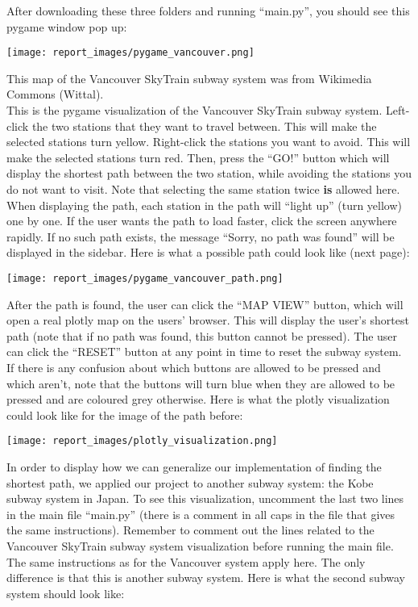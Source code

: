 \documentclass[fontsize=11pt]{article}
\begin{document}
After downloading these three folders and running ``main.py”, you should see this pygame window pop up:

\bigskip
 
\centerline{
    \texttt{[image: report\_images/pygame\_vancouver.png]}
}

\bigskip

This map of the Vancouver SkyTrain subway system was from Wikimedia Commons (Wittal). \\
 
This is the pygame visualization of the Vancouver SkyTrain subway system. Left-click the two stations that they want to travel between. This will make the  selected stations turn yellow. Right-click the stations you want to avoid. This will make the selected stations turn red. Then, press the ``GO!” button which will display the shortest path between the two station, while avoiding the stations you do not want to visit. Note that selecting the same station twice \textbf{is} allowed here. When displaying the path, each station in the path will ``light up” (turn yellow) one by one. If the user wants the path to load faster, click the screen anywhere rapidly. If no such path exists, the message ``Sorry, no path was found” will be displayed in the sidebar. Here is what a possible path could look like (next page):
 
\centerline{
    \texttt{[image: report\_images/pygame\_vancouver\_path.png]}
}

\bigskip
 
After the path is found, the user can click the ``MAP VIEW” button, which will open a real plotly map on the users’ browser. This will display the user’s shortest path (note that if no path was found, this button cannot be pressed). The user can click the “RESET” button at any point in time to reset the subway system. If there is any confusion about which buttons are allowed to be pressed and which aren’t, note that the buttons will turn blue when they are allowed to be pressed and are coloured grey otherwise. Here is what the plotly visualization could look like for the image of the path before:

\bigskip
 
\centerline{
    \texttt{[image: report\_images/plotly\_visualization.png]}
}

\bigskip

In order to display how we can generalize our implementation of finding the shortest path, we applied our project to another subway system: the Kobe subway system in Japan. To see this visualization, uncomment the last two lines in the main file ``main.py” (there is a comment in all caps in the file that gives the same instructions). Remember to comment out the lines related to the Vancouver SkyTrain subway system visualization before running the main file. The same instructions as for the Vancouver system apply here. The only difference is that this is another subway system. Here is what the second subway system should look like:
\end{document}
